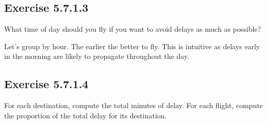 \documentclass[]{book}
\newenvironment{Shaded}{\begin{snugshade}}{\end{snugshade}}
\newcommand{\CommentTok}[1]{\textcolor[rgb]{0.56,0.35,0.01}{\textit{#1}}}
\newcommand{\DataTypeTok}[1]{\textcolor[rgb]{0.13,0.29,0.53}{#1}}
\newcommand{\KeywordTok}[1]{\textcolor[rgb]{0.13,0.29,0.53}{\textbf{#1}}}
\newcommand{\NormalTok}[1]{#1}
\newcommand{\OperatorTok}[1]{\textcolor[rgb]{0.81,0.36,0.00}{\textbf{#1}}}
\newcommand{\OtherTok}[1]{\textcolor[rgb]{0.56,0.35,0.01}{#1}}
\newcommand{\StringTok}[1]{\textcolor[rgb]{0.31,0.60,0.02}{#1}}
\theoremstyle{plain}
\theoremstyle{remark}
\begin{document}
\hypertarget{exercise-5.7.1.3}{%
\subsection*{\texorpdfstring{Exercise {5.7.1.3}}{Exercise 5.7.1.3}}\label{exercise-5.7.1.3}}

What time of day should you fly if you want to avoid delays as much as possible?

Let's group by hour. The earlier the better to fly. This is intuitive as delays early in the morning are likely to propagate throughout the day.

\begin{Shaded}
\end{Shaded}

\hypertarget{exercise-5.7.1.4}{%
\subsection*{\texorpdfstring{Exercise {5.7.1.4}}{Exercise 5.7.1.4}}\label{exercise-5.7.1.4}}

For each destination, compute the total minutes of delay. For each flight, compute the proportion of the total delay for its destination.
\end{document}
